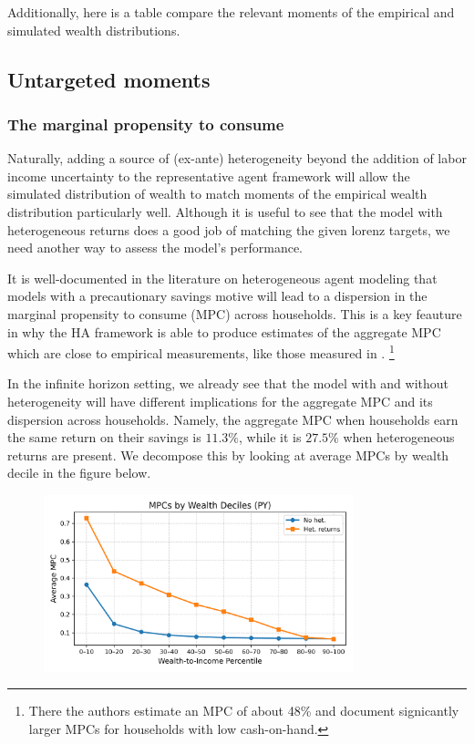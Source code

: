 \par Additionally, here is a table compare the relevant moments of the empirical and simulated wealth distributions.

 

  
\FloatBarrier
\subsection{Untargeted moments}

\subsubsection{The marginal propensity to consume}

\par Naturally, adding a source of (ex-ante) heterogeneity beyond the addition of labor income uncertainty to the representative agent framework will allow the simulated distribution of wealth to match moments of the empirical wealth distribution particularly well. Although it is useful to see that the model with heterogeneous returns does a good job of matching the given lorenz targets, we need another way to assess the model's performance.

\par It is well-documented in the literature on heterogeneous agent modeling that models with a precautionary savings motive will lead to a dispersion in the marginal propensity to consume (MPC) across households. This is a key feauture in why the HA framework is able to produce estimates of the aggregate MPC which are close to empirical measurements, like those measured in \cite{tjlp14}. \footnote{There the authors estimate an MPC of about 48\% and document signicantly larger MPCs for households with low cash-on-hand.}

\par In the infinite horizon setting, we already see that the model with and without heterogeneity will have different implications for the aggregate MPC and its dispersion across households. Namely, the aggregate MPC when households earn the same return on their savings is $11.3\%$, while it is $27.5\%$ when heterogeneous returns are present. We decompose this by looking at average MPCs by wealth decile in the figure below.

\begin{figure}[htbp]
\centering
\includegraphics[width=0.8\textwidth]{Tables/PY_MPC_by_WealthDecile_compare.png}
\label{fig:PYMPCWealthDecileCompare}
\end{figure}

